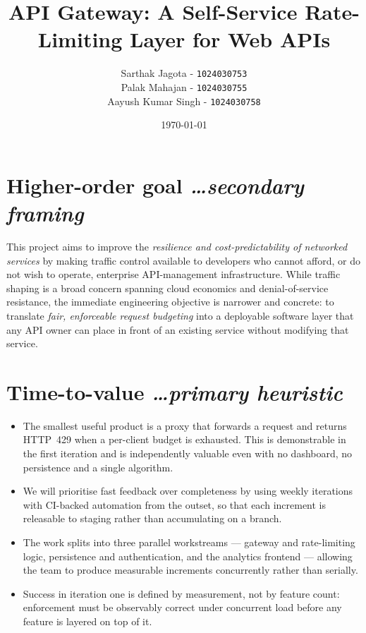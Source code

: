 \documentclass[11pt,a4paper]{article}
\title{API Gateway: A Self-Service Rate-Limiting Layer for Web APIs}
\author{
  Sarthak Jagota - \texttt{1024030753} \\[0.3em]
  Palak Mahajan - \texttt{1024030755} \\[0.3em]
  Aayush Kumar Singh - \texttt{1024030758}
}
\date{\today}
\newcommand{\BvrHint}[1]{%
  {\normalfont\normalsize\itshape\hfill #1}}
\begin{document}
\maketitle

\section{Higher-order goal%
  \BvrHint{\ldots secondary framing}}
This project aims to improve the \emph{resilience and cost-predictability of
networked services} by making traffic control available to developers who
cannot afford, or do not wish to operate, enterprise API-management
infrastructure. While traffic shaping is a broad concern spanning cloud
economics and denial-of-service resistance, the immediate engineering
objective is narrower and concrete: to translate \emph{fair, enforceable
request budgeting} into a deployable software layer that any API owner can
place in front of an existing service without modifying that service.

\section{Time-to-value %
\BvrHint{\ldots primary heuristic}}
\begin{itemize}[leftmargin=0.7cm]
    \item The smallest useful product is a proxy that forwards a request and
      returns HTTP~429 when a per-client budget is exhausted. This is
      demonstrable in the first iteration and is independently valuable even
      with no dashboard, no persistence and a single algorithm.
    \item We will prioritise fast feedback over completeness by using weekly
      iterations with CI-backed automation from the outset, so that each
      increment is releasable to staging rather than accumulating on a branch.
    \item The work splits into three parallel workstreams --- gateway and
      rate-limiting logic, persistence and authentication, and the analytics
      frontend --- allowing the team to produce measurable increments
      concurrently rather than serially.
    \item Success in iteration one is defined by measurement, not by feature
      count: enforcement must be observably correct under concurrent load
      before any feature is layered on top of it.
\end{itemize}
\end{document}
